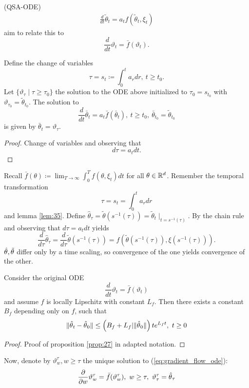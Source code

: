 (QSA-ODE)
\begin{align*}
    \frac{d}{dt}\tilde{\theta}_t=a_tf(\tilde{\theta}_t,\xi_t)
\end{align*}
aim to relate this to 
\[\frac{d}{dt}\vartheta_t=\bar{f}(\vartheta_t).\]
\begin{lemma}\label{lem:35}
    Define the change of variables 
    \[\tau=s_t\coloneqq\int_0^t a_rdr,\ t\geq t_0.\]
    Let \(\{\vartheta_\tau\mid\tau\geq \tau_0\}\) the solution to 
    the ODE above initialized to \(\tau_0=s_{t_0}\) with \(\vartheta_{\tau_0}=\tilde{\theta}_{t_0}\).
    The solution to 
    \[\frac{d}{dt}\bar{\theta}_t=a_t\bar{f}(\bar{\theta}_t),\ t\geq t_0,\ \bar{\theta}_{t_0}=\tilde{\theta}_{t_0}\]
    is given by \(\bar{\theta}_t=\vartheta_\tau\).
\end{lemma}
\begin{proof}
    Change of variables and observing that \[d\tau=a_tdt.\]
\end{proof}
Recall \(\bar{f}(\theta)\coloneqq\lim_{T\to\infty}\int_0^T f(\theta,\xi_t)dt\) for all \(\theta\in\mathbb{R}^d\).
Remember the temporal transformation 
\[\tau=s_t=\int_0^t a_rdr\]
and lemma \ref{lem:35}. Define 
\(\hat{\theta}_\tau=\tilde{\theta}(s^{-1}(\tau))=\tilde{\theta}_t\mid_{t=s^{-1}(\tau)}\). By 
the chain rule and observing that \(d\tau=a_tdt\) yields 
\[\frac{d}{d\tau}\hat{\theta}_\tau=\frac{d}{d\tau}\tilde{\theta}(s^{-1}(\tau))=f(\tilde{\theta}(s^{-1}(\tau)),\xi(s^{-1}(\tau))).\]
\({\hat{\theta}},{\tilde{\theta}}\) differ only by a time scaling, so convergence of the one yields convergence of the other.
\begin{lemma}\label{lem:36}
    Consider the original ODE 
    \begin{equation}\label{eq:gradient_flow_ode}
        \frac{d}{dt}\vartheta_t=\bar{f}(\vartheta_t)  
    \end{equation}
    and assume \(f\) is locally Lipschitz with constant \(L_f\).
    Then there exists a constant \(B_f\)
    depending only on \(f\), such that 
    \[\Vert{\hat{\theta}}_t-{\hat{\theta}}_0\Vert\leq \left(B_f+L_f|\Vert {\hat{\theta}}_0\Vert\right)te^{L_ft},\ t\geq 0\] 
\end{lemma}

\begin{proof}
    Proof of proposition \ref{prop:27} in adapted notation.
\end{proof}

Now, denote by \(\vartheta_w^\tau,w\geq \tau\) the unique solution 
to (\ref{eq:gradient_flow_ode}):
\begin{equation*}
    \frac{\partial }{\partial w}\vartheta_w^\tau=\bar f(\vartheta_w^\tau),\ w\geq \tau,\ \vartheta_\tau^\tau=\thetahat_\tau
\end{equation*}

